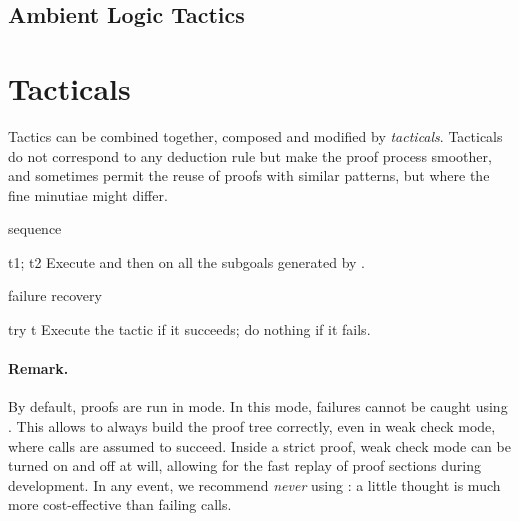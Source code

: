 \subsection{Ambient Logic Tactics}



































\section{Tacticals}
\label{sec:tacticals}

Tactics can be combined together, composed and modified by
\emph{tacticals}. Tacticals do not correspond to any deduction rule
but make the proof process smoother, and sometimes permit the reuse of
proofs with similar patterns, but where the fine minutiae might
differ.

\begin{tactic}[t1; t2]{sequence}
  \begin{tsyntax}[empty]{t1; t2}
  Execute  and then  on all the subgoals generated by .
  \end{tsyntax}
\end{tactic}

\begin{tactic}[try t]{failure recovery}\label{tactic-try}
  \begin{tsyntax}[empty]{try t}
  Execute the tactic  if it succeeds; do nothing if it fails.

  \paragraph{Remark.}
  By default, \EasyCrypt proofs are run in  mode. In this
  mode,  failures cannot be caught using . This allows
  \EasyCrypt to always build the proof tree correctly, even in weak
  check mode, where  calls are assumed to succeed. Inside a
  strict proof, weak check mode can be turned on and off at will,
  allowing for the fast replay of proof sections during
  development. In any event, we recommend \emph{never} using : a little thought is much more cost-effective than failing
   calls.
  \end{tsyntax}
\end{tactic}

